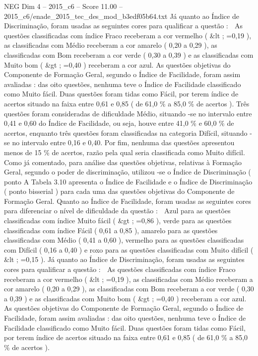 \begin{textsample}{NEG Dim 4 – 2015\_c6 – Score 11.00 – 2015\_c6/enade\_2015\_tec\_des\_mod\_b3edf05b64.txt}
Já quanto ao Índice de Discriminação, foram usadas as seguintes cores para qualificar a questão :  As questões classificadas com índice Fraco receberam a cor vermelho ( \&lt ; =0,19 ), as classificadas com Médio receberam a cor amarelo ( 0,20 a 0,29 ), as classificadas com Bom receberam a cor verde ( 0,30 a 0,39 ) e as classificadas com Muito bom ( \&gt ; =0,40 ) receberam a cor azul.
As questões objetivas do Componente de Formação Geral, segundo o Índice de Facilidade, foram assim avaliadas : das oito questões, nenhuma teve o Índice de Facilidade classificado como Muito fácil.
Duas questões foram tidas como Fácil, por terem índice de acertos situado na faixa entre 0,61 e 0,85 ( de 61,0 \% a 85,0 \% de acertos ).
Três questões foram consideradas de dificuldade Médio, situando -se no intervalo entre 0,41 e 0,60 do Índice de Facilidade, ou seja, houve entre 41,0 \% e 60,0 \% de acertos, enquanto três questões foram classificadas na categoria Difícil, situando -se no intervalo entre 0,16 e 0,40.
Por fim, nenhuma das questões apresentou menos de 15 \% de acertos, razão pela qual seria classificada como Muito difícil.
Como já comentado, para análise das questões objetivas, relativas à Formação Geral, segundo o poder de discriminação, utilizou -se o Índice de Discriminação ( ponto A Tabela 3.10 apresenta o Índice de Facilidade e o Índice de Discriminação ( ponto bisserial ) para cada uma das questões objetivas do Componente de Formação Geral.
Quanto ao Índice de Facilidade, foram usadas as seguintes cores para diferenciar o nível de dificuldade da questão :  Azul para as questões classificadas com índice Muito fácil ( \&gt ; =0,86 ), verde para as questões classificadas com índice Fácil ( 0,61 a 0,85 ), amarelo para as questões classificadas com Médio ( 0,41 a 0,60 ), vermelho para as questões classificadas com Difícil ( 0,16 a 0,40 ) e roxo para as questões classificadas com Muito difícil ( \&lt ; =0,15 ).
Já quanto ao Índice de Discriminação, foram usadas as seguintes cores para qualificar a questão :  As questões classificadas com índice Fraco receberam a cor vermelho ( \&lt ; =0,19 ), as classificadas com Médio receberam a cor amarelo ( 0,20 a 0,29 ), as classificadas com Bom receberam a cor verde ( 0,30 a 0,39 ) e as classificadas com Muito bom ( \&gt ; =0,40 ) receberam a cor azul.
As questões objetivas do Componente de Formação Geral, segundo o Índice de Facilidade, foram assim avaliadas : das oito questões, nenhuma teve o Índice de Facilidade classificado como Muito fácil.
Duas questões foram tidas como Fácil, por terem índice de acertos situado na faixa entre 0,61 e 0,85 ( de 61,0 \% a 85,0 \% de acertos ).

\end{textsample}
